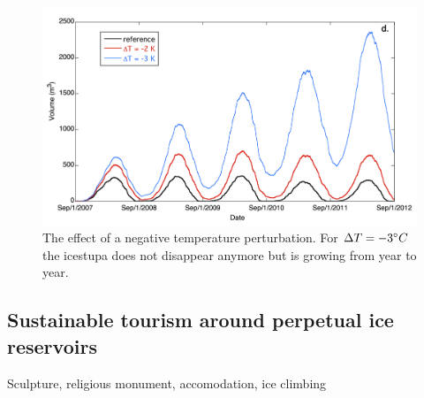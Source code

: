 \begin{figure}[htb]
  \centering
	\includegraphics[width=\textwidth]{figs/PIR_evolution.png}
  \caption{The effect of a negative temperature perturbation. For $\Delta T = -3 ^{\circ} C$ the icestupa does
  not disappear anymore but is growing from year to year.}
\label{fig:PIR_evolution}
\end{figure}

\subsection{Sustainable tourism around perpetual ice reservoirs}

Sculpture, religious monument, accomodation, ice climbing





